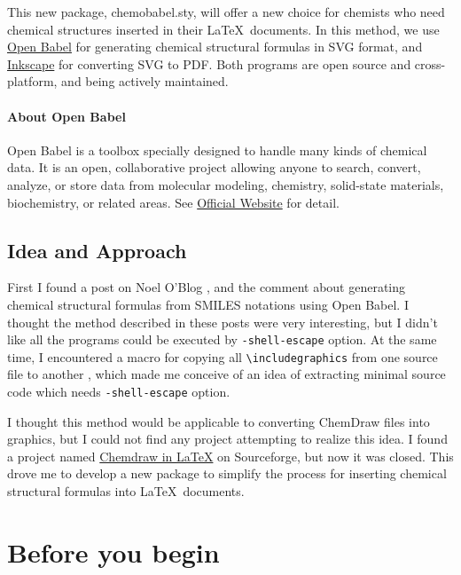 \documentclass[12pt]{ltjsarticle}
\begin{document}
This new package, \textsf{chemobabel.sty}, will offer a new choice for
chemists who need chemical structures inserted in their \LaTeX\ documents.
In this method, we use \href{http://openbabel.org/}{Open Babel} for
generating chemical structural formulas in SVG format,
and \href{https://inkscape.org/en/}{Inkscape} for converting SVG to PDF.
Both programs are open source and cross-platform, and being actively maintained.

\paragraph{About Open Babel}

Open Babel is a toolbox specially designed to handle many kinds of
chemical data. It is an open, collaborative project allowing anyone to search,
convert, analyze, or store data from molecular modeling, chemistry,
solid-state materials, biochemistry, or related areas.
See \href{http://openbabel.org/}{Official Website} for detail.

\clearpage

\subsection{Idea and Approach}

First I found a post on Noel O'Blog \cite{NOB1}, \cite{NOB2} and
the comment \cite{JLA} about generating chemical structural formulas
from SMILES notations using Open Babel.
I thought the method described in these posts were very interesting,
but I didn't like all the programs could be executed by
\verb|-shell-escape| option.
At the same time, I encountered a macro for copying all
\verb|\includegraphics| from one source file to another \cite{OKU},
which made me conceive of an idea of extracting minimal source code
which needs \verb|-shell-escape| option.

I thought this method would be applicable to converting ChemDraw files into
graphics, but I could not find any project attempting to realize this idea.
I found a project named
\href{http://chemdrawinlatex.sourceforge.net/}{Chemdraw in \LaTeX}
on Sourceforge, but now it was closed.
This drove me to develop a new package to simplify the process for
inserting chemical structural formulas into \LaTeX\ documents.


\clearpage

\section{Before you begin}
\end{document}
